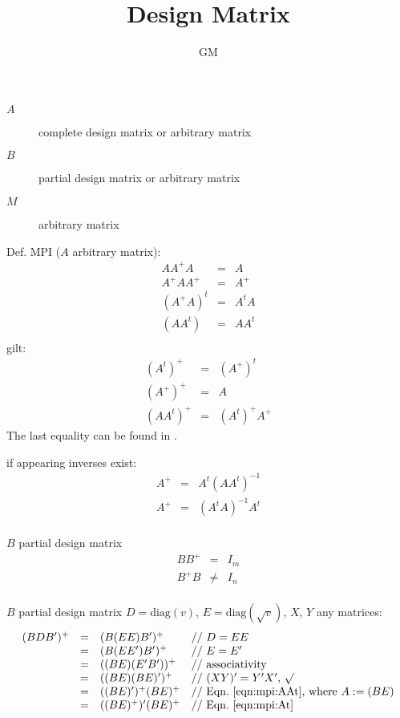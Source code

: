 \documentclass[11pt]{article}
\author{GM}
\title{Design Matrix}
\newcommand{\diag}{\text{diag}}
\begin{document}
\begin{description}
\item[$A$] complete design matrix or arbitrary matrix
\item[$B$] partial  design matrix or arbitrary matrix
\item[$M$] arbitrary matrix
\end{description}

Def. MPI ($A$ arbitrary matrix):
\begin{eqnarray}
A   A^+ A   &=& A \\
A^+ A   A^+ &=& A^+ \\
(A^+ A)^t   &=& A^t A \\
(A A^t)     &=& A A^t \\
\end{eqnarray}
gilt:
\begin{eqnarray}
(A^t)^+  &=& (A^+)^t    \label{eqn:mpi:At} \\
(A^+)^+  &=& A          \label{eqn:mpi:Aplusplus} \\
(AA^t)^+ &=& (A^t)^+ A^+ \label{eqn:mpi:AAt}
\end{eqnarray}
The last equality can be found in \cite[p6,Prop.~3.2]{BaHu12}.

if appearing inverses exist:
\begin{eqnarray*}
A^+ &=&  A^t(AA^t)^{-1} \\
A^+ &=& (A^tA)^{-1} A^t \\
\end{eqnarray*}


$B$ partial design matrix
\begin{eqnarray*}
B B^+ &=& I_m \\
B^+ B &\neq& I_n \\
\end{eqnarray*}

$B$ partial design matrix
$D = \diag(v)$,
$E = \diag(\sqrt{v})$,
$X$, $Y$ any matrices:
\begin{displaymath}
\begin{array}{llll}
(BDB')^+ &=& (B(EE)B')^+        & \text{// $D = EE$} \\
         &=& (B(EE')B')^+       & \text{// $E = E'$} \\
         &=& ((BE)(E'B'))^+     & \text{// associativity} \\
         &=& ((BE)(BE)')^+      & \text{// $(XY)'= Y'X'$, $\surd$} \\
         &=& ((BE)')^+ (BE)^+   & \text{// Eqn.~\ref{eqn:mpi:AAt}, where $A:=(BE)$} \\
         &=& ((BE)^+)' (BE)^+   & \text{// Eqn.~\ref{eqn:mpi:At}} 
\end{array}
\end{displaymath}





\end{document}
